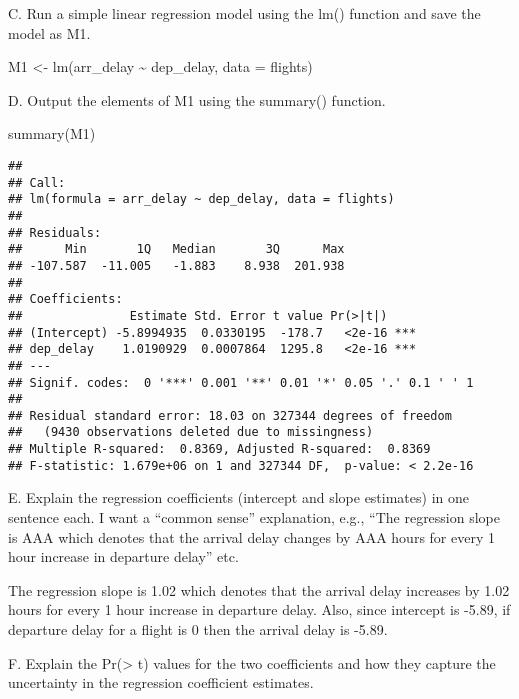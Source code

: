 \documentclass[
]{article}
\newenvironment{Shaded}{\begin{snugshade}}{\end{snugshade}}
\newcommand{\AttributeTok}[1]{\textcolor[rgb]{0.77,0.63,0.00}{#1}}
\newcommand{\FunctionTok}[1]{\textcolor[rgb]{0.00,0.00,0.00}{#1}}
\newcommand{\NormalTok}[1]{#1}
\newcommand{\OtherTok}[1]{\textcolor[rgb]{0.56,0.35,0.01}{#1}}
\newcommand{\SpecialCharTok}[1]{\textcolor[rgb]{0.00,0.00,0.00}{#1}}
\begin{document}
C. Run a simple linear regression model using the lm() function and save
the model as M1.

\begin{Shaded}
\begin{Highlighting}[]
\NormalTok{M1 }\OtherTok{\textless{}{-}} \FunctionTok{lm}\NormalTok{(arr\_delay }\SpecialCharTok{\textasciitilde{}}\NormalTok{ dep\_delay, }\AttributeTok{data =}\NormalTok{ flights)}
\end{Highlighting}
\end{Shaded}

D. Output the elements of M1 using the summary() function.

\begin{Shaded}
\begin{Highlighting}[]
\FunctionTok{summary}\NormalTok{(M1)}
\end{Highlighting}
\end{Shaded}

\begin{verbatim}
## 
## Call:
## lm(formula = arr_delay ~ dep_delay, data = flights)
## 
## Residuals:
##      Min       1Q   Median       3Q      Max 
## -107.587  -11.005   -1.883    8.938  201.938 
## 
## Coefficients:
##               Estimate Std. Error t value Pr(>|t|)    
## (Intercept) -5.8994935  0.0330195  -178.7   <2e-16 ***
## dep_delay    1.0190929  0.0007864  1295.8   <2e-16 ***
## ---
## Signif. codes:  0 '***' 0.001 '**' 0.01 '*' 0.05 '.' 0.1 ' ' 1
## 
## Residual standard error: 18.03 on 327344 degrees of freedom
##   (9430 observations deleted due to missingness)
## Multiple R-squared:  0.8369, Adjusted R-squared:  0.8369 
## F-statistic: 1.679e+06 on 1 and 327344 DF,  p-value: < 2.2e-16
\end{verbatim}

E. Explain the regression coefficients (intercept and slope estimates)
in one sentence each. I want a ``common sense'' explanation, e.g., ``The
regression slope is AAA which denotes that the arrival delay changes by
AAA hours for every 1 hour increase in departure delay'' etc.

The regression slope is 1.02 which denotes that the arrival delay
increases by 1.02 hours for every 1 hour increase in departure delay.
Also, since intercept is -5.89, if departure delay for a flight is 0
then the arrival delay is -5.89.

F. Explain the Pr(\textgreater{} \textbar t\textbar) values for the two
coefficients and how they capture the uncertainty in the regression
coefficient estimates.
\end{document}
